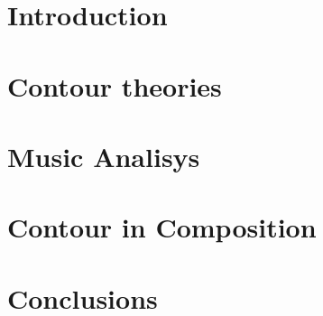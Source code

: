 

\section{Introduction}
\label{sec:introduction}

\section{Contour theories}
\label{sec:contour-theories}

\section{Music Analisys}
\label{sec:music-analisys}

\section{Contour in Composition}
\label{sec:contour-composition}

\section{Conclusions}
\label{sec:conclusions}

